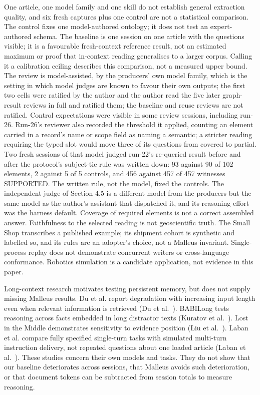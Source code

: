 One article, one model family and one skill do not establish general extraction quality, and six fresh captures plus one control are not a statistical comparison. The control fixes one model-authored ontology; it does not test an expert-authored schema. The baseline is one session on one article with the questions visible; it is a favourable fresh-context reference result, not an estimated maximum or proof that in-context reading generalises to a larger corpus. Calling it a calibration ceiling describes this comparison, not a measured upper bound. The review is model-assisted, by the producers' own model family, which is the setting in which model judges are known to favour their own outputs; the first two cells were ratified by the author and the author read the five later graph-result reviews in full and ratified them; the baseline and reuse reviews are not ratified. Control expectations were visible in some review sessions, including run-26. Run-26's reviewer also recorded the threshold it applied, counting an element carried in a record's name or scope field as naming a semantic; a stricter reading requiring the typed slot would move three of its questions from covered to partial. Two fresh sessions of that model judged run-22's re-queried result before and after the protocol's subject-tie rule was written down: 93 against 90 of 102 elements, 2 against 5 of 5 controls, and 456 against 457 of 457 witnesses SUPPORTED. The written rule, not the model, fixed the controls. The independent judge of Section 4.5 is a different model from the producers but the same model as the author's assistant that dispatched it, and its reasoning effort was the harness default. Coverage of required elements is not a correct assembled answer. Faithfulness to the selected reading is not geoscientific truth. The Small Shop transcribes a published example; its shipment cohort is synthetic and labelled so, and its rules are an adopter's choice, not a Malleus invariant. Single-process replay does not demonstrate concurrent writers or cross-language conformance. Robotics simulation is a candidate application, not evidence in this paper.

Long-context research motivates testing persistent memory, but does not supply missing Malleus results. Du et al. report degradation with increasing input length even when relevant information is retrieved (Du et al.~\cite{du2025context}). BABILong tests reasoning across facts embedded in long distractor texts (Kuratov et al.~\cite{kuratov2024babilong}). Lost in the Middle demonstrates sensitivity to evidence position (Liu et al.~\cite{liu2023lost}). Laban et al. compare fully specified single-turn tasks with simulated multi-turn instruction delivery, not repeated questions about one loaded article (Laban et al.~\cite{laban2025lost}). These studies concern their own models and tasks. They do not show that our baseline deteriorates across sessions, that Malleus avoids such deterioration, or that document tokens can be subtracted from session totals to measure reasoning.

